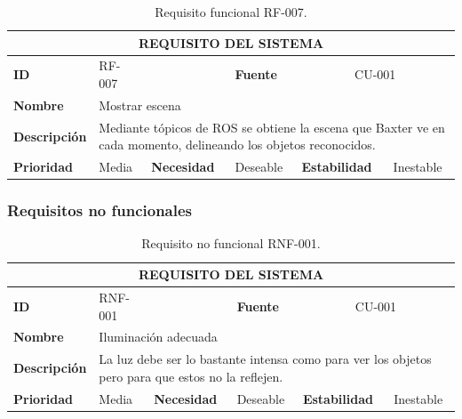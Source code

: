 \begin{table}[H]
	\centering
	\begin{tabular}{|p{2cm} | p{1.5cm} | p{2cm} | p{1.7cm} | p{2cm} | p{2cm} |}
		\hline
		\multicolumn{6}{|c|}{\textbf{REQUISITO DEL SISTEMA}} \\ 
		\hline
		\textbf{ID} & RF-007 & & \textbf{Fuente} & \multicolumn{2}{c|}{CU-001} \\
		\hline
		\textbf{Nombre} & \multicolumn{5}{l|}{Mostrar escena} \\
		\hline
		\textbf{Descripción} & \multicolumn{5}{l|}{\parbox{30em}{Mediante tópicos de ROS se obtiene la escena que Baxter ve en cada momento, delineando los objetos reconocidos.}} \\
		\hline
		\textbf{Prioridad} & Media & \textbf{Necesidad} & Deseable & \textbf{Estabilidad} & Inestable \\
		\hline		
	\end{tabular}
	\caption{Requisito funcional RF-007.}
	\label{cuad:RF-007}
\end{table}

\subsubsection{Requisitos no funcionales}

\begin{table}[H]
	\centering
	\begin{tabular}{|p{2cm} | p{1.5cm} | p{2cm} | p{1.7cm} | p{2cm} | p{2cm} |}
		\hline
		\multicolumn{6}{|c|}{\textbf{REQUISITO DEL SISTEMA}} \\ 
		\hline
		\textbf{ID} & RNF-001 & & \textbf{Fuente} & \multicolumn{2}{c|}{CU-001} \\
		\hline
		\textbf{Nombre} & \multicolumn{5}{l|}{Iluminación adecuada} \\
		\hline
		\textbf{Descripción} & \multicolumn{5}{l|}{\parbox{30em}{La luz debe ser lo bastante intensa como para ver los objetos pero para que estos no la reflejen.}} \\ 
		\hline
		\textbf{Prioridad} & Media & \textbf{Necesidad} & Deseable & \textbf{Estabilidad} & Inestable \\
		\hline		
	\end{tabular}
	\caption{Requisito no funcional RNF-001.}
	\label{cuad:RNF-001}
\end{table}

